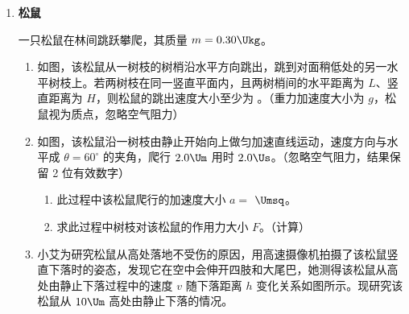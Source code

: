 \documentclass[\gkver]{gaokaozhenti}
\begin{document}
\begin{enumerate}
{3．光路如图所示，设折射角为 $\alpha$，根据折射率定义式可得 $n=\frac{\sin\theta}{\sin\alpha}$。

\onepicture[w=5.24cm]{}

设全反射的临界角为 $C$，可得 $\sin C=\frac{1}{n}$。

设圆筒内表面半径为 $r$，在入射点、全反射点、圆心点构成的三角形中，根据正弦定理可得

\[\frac{r}{\sin\alpha}=\frac{R}{\sin(\pi-C)}=\frac{R}{\sin C}\]

解得 $r=\frac{R\sin\alpha}{\sin C}=R\frac{\frac{\sin\theta}{n}}{\frac{1}{n}}=R\sin\theta$。

则筒壁厚度为 $R-r=R(1-\sin\theta)$。
}

\item
\textbf{松鼠}

一只松鼠在林间跳跃攀爬，其质量 $m=0.30 \Ukg$。

\onepicture[align=right, h=4.95cm]{}
\begin{enumerate}
	\item
	如图，该松鼠从一树枝的树梢沿水平方向跳出，跳到对面稍低处的另一水平树枝上。若两树枝在同一竖直平面内，且两树梢间的水平距离为 $L$、竖直距离为 $H$，则松鼠的跳出速度大小至少为 。（重力加速度大小为 $g$，松鼠视为质点，忽略空气阻力）

	\item
	如图，该松鼠沿一树枝由静止开始向上做匀加速直线运动，速度方向与水平成 $\theta=60^{\circ}$ 的夹角，爬行 $2.0 \Um$ 用时 $2.0 \Us$。（忽略空气阻力，结果保留 2 位有效数字）

	\onepicture[align=right, h=2.64cm]{}

	\begin{enumerate}
		\item
		此过程中该松鼠爬行的加速度大小 $a=$  $\Umsq$。

		\item
		求此过程中树枝对该松鼠的作用力大小 $F$。（计算）
	\end{enumerate}

	\item
	小艾为研究松鼠从高处落地不受伤的原因，用高速摄像机拍摄了该松鼠竖直下落时的姿态，发现它在空中会伸开四肢和大尾巴，她测得该松鼠从高处由静止下落过程中的速度 $v$ 随下落距离 $h$ 变化关系如图所示。现研究该松鼠从 $10 \Um$ 高处由静止下落的情况。


\end{enumerate}
\end{enumerate}
\end{document}
